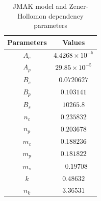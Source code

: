\documentclass[metals,article,submit,pdftex,moreauthors]{Definitions/mdpi}
\begin{document}
\begin{table}[h]
\caption{JMAK model and Zener-Hollomon dependency parameters }\vspace{-1mm}
\begin{tabular}{cc}
\toprule
Parameters & Values  \\
\hline
$A_c$&$4.4268\times10^{-5}	$\\
$A_p$&$29.85\times10^{-5}$\\
$B_c$&$0.0720627$\\
$B_p$&$0.103141	$\\
$B_s$&$10265.8	$\\
$n_c$&$0.235832	$\\
$n_p$&$0.203678	$\\
$m_c$&$0.188236	$\\
$m_p$&$0.181822	$\\
$m_s$&$-0.19708	$\\
$k$  &$0.48632	$\\
$n_k$&$3.36531$ \\
\bottomrule
\end{tabular}	
\label{tab:allparams}
\end{table}
\end{document}
